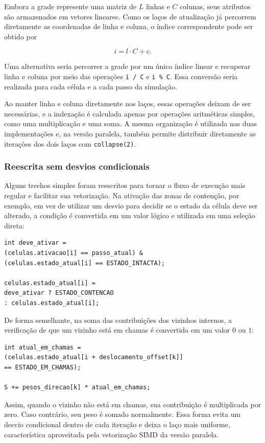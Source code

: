 \documentclass[11pt,a4paper]{article}
\begin{document}
Embora a grade represente uma matriz de $L$ linhas e $C$ colunas, seus atributos são armazenados em vetores lineares. Como os laços de atualização já percorrem diretamente as coordenadas de linha e coluna, o índice correspondente pode ser obtido por

$$
i = l \cdot C + c.
$$

Uma alternativa seria percorrer a grade por um único índice linear e recuperar linha e coluna por meio das operações \texttt{i / C} e \texttt{i \% C}. Essa conversão seria realizada para cada célula e a cada passo da simulação.

Ao manter linha e coluna diretamente nos laços, essas operações deixam de ser necessárias, e a indexação é calculada apenas por operações aritméticas simples, como uma multiplicação e uma soma. A mesma organização é utilizada nas duas implementações e, na versão paralela, também permite distribuir diretamente as iterações dos dois laços com \texttt{collapse(2)}.

\subsubsection{Reescrita sem desvios condicionais}

Alguns trechos simples foram reescritos para tornar o fluxo de execução mais regular e facilitar sua vetorização. Na ativação das zonas de contenção, por exemplo, em vez de utilizar um desvio para decidir se o estado da célula deve ser alterado, a condição é convertida em um valor lógico e utilizada em uma seleção direta:

\begin{lstlisting}
int deve_ativar =
(celulas.ativacao[i] == passo_atual) &
(celulas.estado_atual[i] == ESTADO_INTACTA);

celulas.estado_atual[i] =
deve_ativar ? ESTADO_CONTENCAO
: celulas.estado_atual[i];
\end{lstlisting}

De forma semelhante, na soma das contribuições dos vizinhos internos, a verificação de que um vizinho está em chamas é convertida em um valor $0$ ou $1$:

\begin{lstlisting}
int atual_em_chamas =
(celulas.estado_atual[i + deslocamento_offset[k]]
== ESTADO_EM_CHAMAS);

S += pesos_direcao[k] * atual_em_chamas;
\end{lstlisting}

Assim, quando o vizinho não está em chamas, sua contribuição é multiplicada por zero. Caso contrário, seu peso é somado normalmente. Essa forma evita um desvio condicional dentro de cada iteração e deixa o laço mais uniforme, característica aproveitada pela vetorização SIMD da versão paralela.
\end{document}
